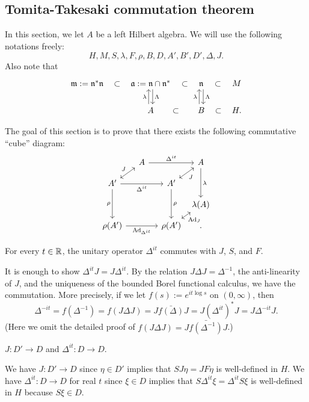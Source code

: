 \documentclass{../../small}
\begin{document}
\subsection{Tomita-Takesaki commutation theorem}

In this section, we let $A$ be a left Hilbert algebra.
We will use the following notations freely:
\[H,M,S,\lambda,F,\rho,B,D,A',B',D',\Delta,J.\]
Also note that
\[\begin{tikzcd}
\fm:=\fn^*\fn \rar[phantom,"\subset"] & \fa:=\fn\cap\fn^* \rar[phantom,"\subset"]\dar[shift left]{\Lambda} & \fn \rar[phantom,"\subset"]\dar[shift left]{\Lambda} & M\\
& A \rar[phantom,"\subset"]\uar[shift left]{\lambda} & B \rar[phantom,"\subset"]\uar[shift left]{\lambda} & H.
\end{tikzcd}\]

The goal of this section is to prove that there exists the following commutative ``cube'' diagram:
\[\begin{tikzcd}[column sep={3.5em,between origins},row sep={2.5em,between origins}]
&A\ar{rr}{\Delta^{it}}&&A\ar{dd}{\lambda}\\
A'\ar[<->]{ur}{J}\ar[swap]{rr}{\Delta^{it}}\ar[swap]{dd}{\rho}&&A'\ar[<->,swap]{ur}{J}\ar{dd}{\rho}&\\
&&&\lambda(A)\\
\rho(A')\ar[swap]{rr}{\Ad_{\Delta^{it}}}&&\rho(A')\ar[<->,swap]{ur}{\Ad_J}&.
\end{tikzcd}\]


\begin{lem*}
For every $t\in\mathbb{R}$, the unitary operator $\Delta^{it}$ commutes with $J$, $S$, and $F$.
\end{lem*}
\begin{pf}
It is enough to show $\Delta^{it}J=J\Delta^{it}$.
By the relation $J\Delta J=\Delta^{-1}$, the anti-linearity of $J$, and the uniqueness of the bounded Borel functional calculus, we have the commutation.
More precisely, if we let $f(s):=e^{it\log s}$ on $(0,\infty)$, then
\[\Delta^{-it}=f(\Delta^{-1})=f(J\Delta J)=J\bar{f(\Delta)}J=J(\Delta^{it})^*J=J\Delta^{-it}J.\]
(Here we omit the detailed proof of $f(J\Delta J)=J\bar{f(\Delta^{-1})}J$.)
\end{pf}


\begin{lem*}
$J:D'\to D$ and $\Delta^{it}:D\to D$.
\end{lem*}
\begin{pf}
We have $J:D'\to D$ since $\eta\in D'$ implies that $SJ\eta=JF\eta$ is well-defined in $H$.
We have $\Delta^{it}:D\to D$ for real $t$ since $\xi\in D$ implies that $S\Delta^{it}\xi=\Delta^{it}S\xi$ is well-defined in $H$ because $S\xi\in D$.
\end{pf}
\end{document}
